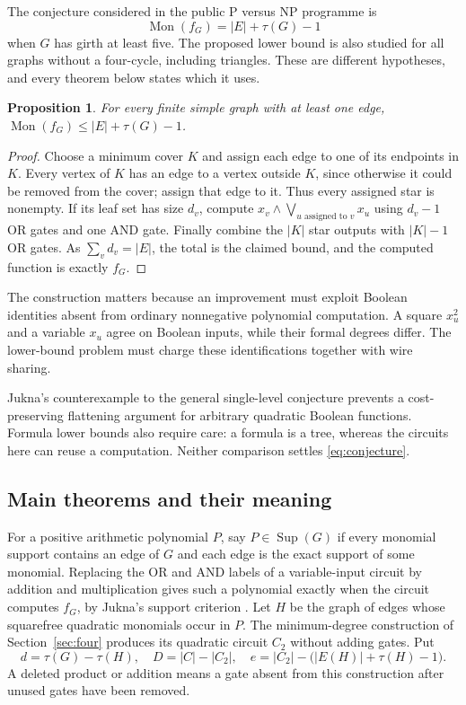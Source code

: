 \documentclass[11pt]{article}
\DeclareMathOperator{\Mon}{Mon}
\DeclareMathOperator{\Sup}{Sup}
\newtheorem{proposition}[theorem]{Proposition}
\theoremstyle{definition}
\begin{document}
The conjecture considered in the public P versus NP programme is
\begin{equation}\label{eq:conjecture}
 \Mon(f_G)=|E|+\tau(G)-1
\end{equation}
when $G$ has girth at least five. The proposed lower bound is also studied for all graphs without a four-cycle, including triangles. These are different hypotheses, and every theorem below states which it uses.

\begin{proposition}\label{prop:upper}
For every finite simple graph with at least one edge,
$\Mon(f_G)\leq|E|+\tau(G)-1$.
\end{proposition}
\begin{proof}
Choose a minimum cover $K$ and assign each edge to one of its endpoints in $K$. Every vertex of $K$ has an edge to a vertex outside $K$, since otherwise it could be removed from the cover; assign that edge to it. Thus every assigned star is nonempty. If its leaf set has size $d_v$, compute
$x_v\wedge\bigvee_{u\text{ assigned to }v}x_u$ using $d_v-1$ OR gates and one AND gate. Finally combine the $|K|$ star outputs with $|K|-1$ OR gates. As $\sum_vd_v=|E|$, the total is the claimed bound, and the computed function is exactly $f_G$.
\end{proof}

The construction matters because an improvement must exploit Boolean identities absent from ordinary nonnegative polynomial computation. A square $x_u^2$ and a variable $x_u$ agree on Boolean inputs, while their formal degrees differ. The lower-bound problem must charge these identifications together with wire sharing.

Jukna's counterexample to the general single-level conjecture \citep{JuknaSingle} prevents a cost-preserving flattening argument for arbitrary quadratic Boolean functions. Formula lower bounds also require care: a formula is a tree, whereas the circuits here can reuse a computation. Neither comparison settles \eqref{eq:conjecture}.

\subsection{Main theorems and their meaning}
For a positive arithmetic polynomial $P$, say $P\in\Sup(G)$ if every monomial support contains an edge of $G$ and each edge is the exact support of some monomial. Replacing the OR and AND labels of a variable-input circuit by addition and multiplication gives such a polynomial exactly when the circuit computes $f_G$, by Jukna's support criterion \citep[Lemma~1, p.~7]{JuknaRead}.
Let $H$ be the graph of edges whose squarefree quadratic monomials occur in $P$. The minimum-degree construction of Section~\ref{sec:four} produces its quadratic circuit $C_2$ without adding gates. Put
\[
 d=\tau(G)-\tau(H),\quad D=|C|-|C_2|,\quad
 e=|C_2|-\bigl(|E(H)|+\tau(H)-1\bigr).
\]
A deleted product or addition means a gate absent from this construction after unused gates have been removed.
\end{document}
